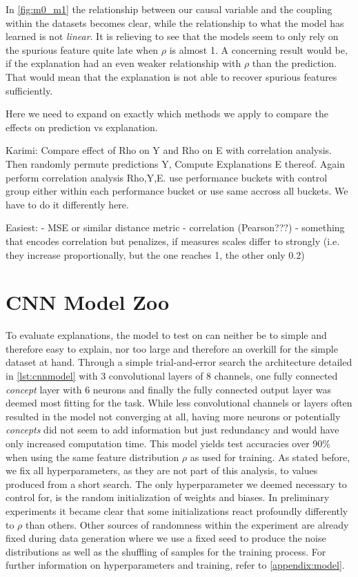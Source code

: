 In \cref{fig:m0_m1} the relationship between our causal variable and the coupling within the datasets becomes clear, while the relationship to what the model has learned is not \textit{linear}. It is relieving to see that the models seem to only rely on the spurious feature quite late when $\rho$ is almost 1. A concerning result would be, if the explanation had an even weaker relationship with $\rho$ than the prediction. That would mean that the explanation is not able to recover spurious features sufficiently. 

Here we need to expand on exactly which methods we apply to compare the effects on prediction vs explanation. 

Karimi: Compare effect of Rho on Y and Rho on E with correlation analysis. Then randomly permute predictions Y, Compute Explanations E thereof. Again perform correlation analysis Rho,Y,E. 
use performance buckets with control group either within each performance bucket or use same accross all buckets. 
We have to do it differently here.

Easiest: 
- MSE or similar distance metric
- correlation (Pearson???)
- something that encodes correlation but penalizes, if measures scales differ to strongly (i.e. they increase proportionally, but the one reaches 1, the other only 0.2)


\section{CNN Model Zoo}\label{section:training}
To evaluate explanations, the model to test on can neither be to simple and therefore easy to explain, nor too large and therefore an overkill for the simple dataset at hand.
Through a simple trial-and-error search the architecture detailed in \cref{lst:cnnmodel} with 3 convolutional layers of 8 channels, one fully connected \textit{concept} layer with 6 neurons and finally the fully connected output layer was deemed most fitting for the task. While less convolutional channels or layers often resulted in the model not converging at all, having more neurons or potentially \textit{concepts} did not seem to add information but just redundancy and would have only increased computation time.
This model yields test accuracies over 90\% when using the same feature distribution $\rho$ as used for training. As stated before, we fix all hyperparameters, as they are not part of this analysis, to values produced from a short search.
The only hyperparameter we deemed necessary to control for, is the random initialization of weights and biases. In preliminary experiments it became clear that some initializations react profoundly differently to $\rho$ than others. Other sources of randomness within the experiment are already fixed during data generation where we use a fixed seed to produce the noise distributions as well as the shuffling of samples for the training process. 
For further information on hyperparameters and training, refer to \cref{appendix:model}.
